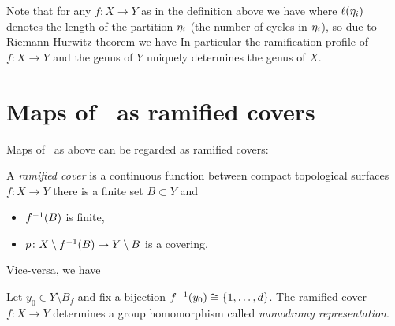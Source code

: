 \documentclass[../main/main.tex]{subfiles}
\begin{document}
Note that for any $f\colon X\to Y$ as in the definition above we have 
where $\ell(\eta_i)$ denotes the length of the partition $\eta_i$ (\ie the number of cycles in $\eta_i$), so due to Riemann-Hurwitz theorem we have 
In particular the ramification profile of $f:X\to Y$ and the genus of $Y$ uniquely determines the genus of $X$. 

\section{Maps of \rss\ as ramified covers}

Maps of \rss\ as above can be regarded as ramified covers:

\begin{definition}
	A \emph{ramified cover} is a continuous function between compact topological surfaces $f\colon X\to Y$ \st there is a finite set $B\subset Y$ and
	\begin{itemize}
		\item$f^{-1}(B)$ is finite,
		\item $p\colon X\setminus f^{-1}(B)\to Y\setminus B$ is a covering.
	\end{itemize}
\end{definition}

Vice-versa, we have


\begin{definition}
	Let $y_0\in Y\setminus B_f$ and fix a bijection $f^{-1}(y_0)\cong\{1,\ldots,d\}$. The ramified cover $f\colon X\to Y$ determines a group homomorphism 
	called \emph{monodromy representation}.
\end{definition}
\end{document}

